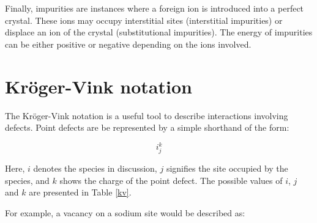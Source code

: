 \documentclass[12pt]{report}
\begin{document}
Finally, impurities are instances where a foreign ion is introduced into a perfect crystal.
These ions may occupy interstitial sites (interstitial impurities) or displace an ion of the crystal (substitutional impurities).
The energy of impurities can be either positive or negative depending on the ions involved.

\section{Kr\"oger-Vink notation}

The Kr\"oger-Vink notation is a useful tool to describe interactions involving defects.
Point defects are be represented by a simple shorthand of the form:

\begin{equation}
    i_{j}^{k}
\end{equation}

\noindent
Here, $i$ denotes the species in discussion, $j$ signifies the site occupied by the species, and $k$ shows the charge of the point defect. The possible values of $i$, $j$ and $k$ are presented in Table \ref{kv}.

\begin{table}[h]
\centering
{}
\caption{Details of the Kr\"oger-Vink notation system to describe point defects in crystal systems. }
\label{kv}
\end{table}

\noindent
For example, a vacancy on a sodium site would be described as:
\end{document}
